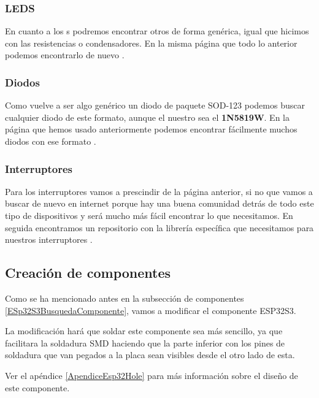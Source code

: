 \subsubsection{\gls{LED}S}

En cuanto a los s podremos encontrar otros de forma genérica, igual que hicimos con las resistencias o condensadores. En la misma página que todo lo anterior podemos encontrarlo de nuevo \cite{SnapedaWS2812B}.

\subsubsection{Diodos}

Como vuelve a ser algo genérico un diodo de paquete SOD-123 podemos buscar cualquier diodo de este formato, aunque el nuestro sea el \textbf{1N5819W}. En la página que hemos usado anteriormente podemos encontrar fácilmente muchos diodos con ese formato \cite{Snapeda1N5819W}.

\subsubsection{Interruptores}

Para los interruptores vamos a prescindir de la página anterior, si no que vamos a buscar de nuevo en internet porque hay una buena comunidad detrás de todo este tipo de dispositivos y será mucho más fácil encontrar lo que necesitamos. En seguida encontramos un repositorio con la librería específica que necesitamos para nuestros interruptores \cite{GitInterruptores}.

\subsection{Creación de componentes}

Como se ha mencionado antes en la subsección de componentes \ref{ESp32S3BusquedaComponente}, vamos a modificar el componente ESP32S3.

La modificación hará que soldar este componente sea más sencillo, ya que facilitara la soldadura \gls{SMD} haciendo que la parte inferior con los pines de soldadura que van pegados a la placa sean visibles desde el otro lado de esta.

\begin{tcolorbox}[colback=blue!5!white, colframe=blue!55!white, title=Nota]
    Ver el apéndice \ref{ApendiceEsp32Hole} para más información sobre el diseño de este componente.
\end{tcolorbox}

